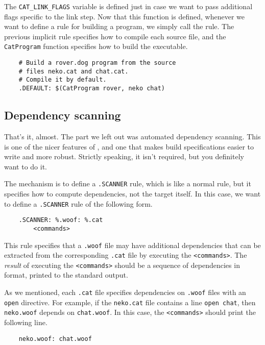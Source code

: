 The \verb+CAT_LINK_FLAGS+ variable is defined just in case we want to pass additional flags specific
to the link step.  Now that this function is defined, whenever we want to define a rule for building
a program, we simply call the rule.  The previous implicit rule specifies how to compile each source file,
and the \verb+CatProgram+ function specifies how to build the executable.

\begin{verbatim}
    # Build a rover.dog program from the source
    # files neko.cat and chat.cat.
    # Compile it by default.
    .DEFAULT: $(CatProgram rover, neko chat)
\end{verbatim}

\subsection{Dependency scanning}
\label{sec:scanner-exm}

That's it, almost.  The part we left out was automated dependency scanning.  This is one of the
nicer features of \OMake{}, and one that makes build specifications easier to write and more robust.
Strictly speaking, it isn't required, but you definitely want to do it.

The mechanism is to define a \verb+.SCANNER+ rule, which is like a normal rule, but it specifies how
to compute dependencies, not the target itself.  In this case, we want to define a \verb+.SCANNER+
rule of the following form.

\begin{verbatim}
    .SCANNER: %.woof: %.cat
        <commands>
\end{verbatim}

This rule specifies that a \verb+.woof+ file may have additional dependencies that can be extracted
from the corresponding \verb+.cat+ file by executing the \verb+<commands>+.  The \emph{result} of
executing the \verb+<commands>+ should be a sequence of dependencies in \OMake{} format, printed to the
standard output.

As we mentioned, each \verb+.cat+ file specifies dependencies on \verb+.woof+ files with an
\verb+open+ directive.  For example, if the \verb+neko.cat+ file contains a line \verb+open chat+,
then \verb+neko.woof+ depends on \verb+chat.woof+.  In this case, the \verb+<commands>+ should print
the following line.

\begin{verbatim}
    neko.woof: chat.woof
\end{verbatim}

